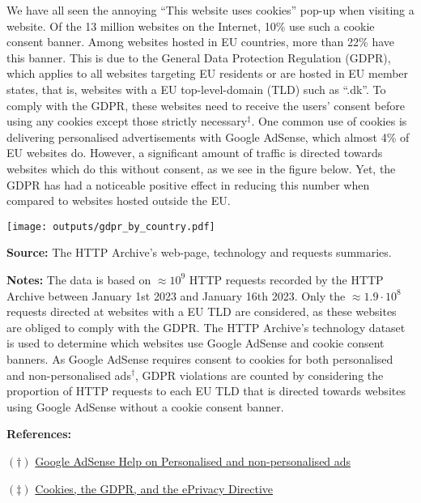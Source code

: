 \documentclass[border=0mm]{article}
\begin{document}
\begin{minipage}{0.5\textwidth}
\small
\vspace*{0.2cm}
We have all seen the annoying ``This website uses cookies'' pop-up when visiting a website.
Of the 13 million websites on the Internet, 10\% use such a cookie consent banner. Among
websites hosted in EU countries, more than 22\% have this banner.
This is due to the General Data Protection Regulation (GDPR), which
applies to all websites targeting EU residents
or are hosted in EU member states, that is, websites with a EU top-level-domain (TLD)
such as ``.dk''. To comply with the GDPR, these websites need to receive the users' consent
before using any cookies except those strictly necessary$^\ddagger$. One common use of cookies is delivering
personalised advertisements with Google AdSense, which almost 4\% of EU websites do.
However, a significant amount of traffic is directed towards websites which do this without
consent, as we see in the figure below. Yet, the GDPR has had a noticeable positive effect in reducing this number when compared
to websites hosted outside the EU.

\vspace*{.2cm}

\texttt{[image: outputs/gdpr\_by\_country.pdf]}

{\small\linespread{.1}\selectfont\fontsize{8pt}{.1cm}\selectfont
\textbf{Source:} The HTTP Archive's web-page, technology and requests summaries.

\textbf{Notes:} The data is based on $\approx 10^9$ HTTP requests recorded by the HTTP Archive
    between January 1st 2023 and January 16th 2023. Only the $\approx 1.9 \cdot 10^8$ requests
    directed at websites with a EU TLD are considered, as these websites are
    obliged to comply with the GDPR.
    The HTTP Archive's technology dataset is used
    to determine which websites use Google AdSense and cookie consent banners. As Google AdSense
    requires consent to cookies for both personalised and non-personalised ads$^{\dagger}$,
    GDPR violations are counted by considering the proportion of HTTP requests to each EU TLD that
    is directed towards websites using Google AdSense without a cookie consent banner.
\par}


\begin{references}[width=1\textwidth,arc=10pt,auto outer arc]
\textbf{References:}

$(\dagger)$ \href{https://support.google.com/adsense/answer/9007336}{\color{dark} Google AdSense Help on Personalised and non-personalised ads}

$(\ddagger)$ \href{https://gdpr.eu/cookies/}{\color{dark} Cookies, the GDPR, and the ePrivacy Directive}
\end{references}



\end{minipage}%
\end{document}
